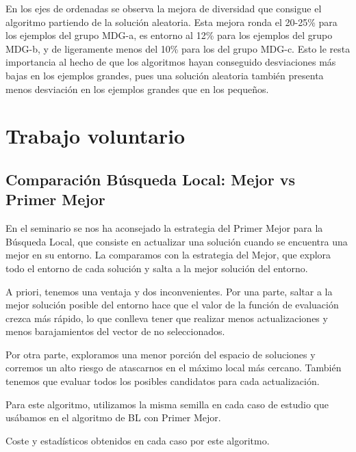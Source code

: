\documentclass{article}
\begin{document}
En los ejes de ordenadas se observa la mejora de diversidad que consigue el algoritmo partiendo de la solución aleatoria. Esta mejora ronda el 
20-25\% para los ejemplos del grupo MDG-a, es entorno al 12\% para los ejemplos del grupo MDG-b, y de ligeramente menos del 10\%
para los del grupo MDG-c. Esto le resta importancia al hecho de que los algoritmos hayan conseguido desviaciones más bajas en los
ejemplos grandes, pues una solución aleatoria también presenta menos desviación en los ejemplos grandes que en los pequeños.

\pagebreak

\section{Trabajo voluntario}

\subsection{Comparación Búsqueda Local: Mejor vs Primer Mejor}

En el seminario se nos ha aconsejado la estrategia del Primer Mejor para la Búsqueda Local, que consiste en actualizar una
solución cuando se encuentra una mejor en su entorno. La comparamos con la estrategia del Mejor, que explora todo el entorno
de cada solución y salta a la mejor solución del entorno.

A priori, tenemos una ventaja y dos inconvenientes. Por una parte, saltar a la mejor solución posible del entorno hace que el
valor de la función de evaluación crezca más rápido, lo que conlleva tener que realizar menos actualizaciones y menos barajamientos
del vector de no seleccionados.

Por otra parte, exploramos una menor porción del espacio de soluciones y corremos un alto riesgo de atascarnos en el máximo local
más cercano. También tenemos que evaluar todos los posibles candidatos para cada actualización.

Para este algoritmo, utilizamos la misma semilla en cada caso de estudio que usábamos en el algoritmo de BL con Primer Mejor.

Coste y estadísticos obtenidos en cada caso por este algoritmo.
\end{document}
